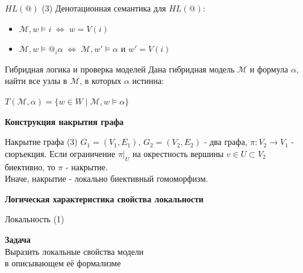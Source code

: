 \documentclass{beamer}
\begin{document}
\begin{frame}{$HL(@)$ (3)}
Денотационная семантика для $HL(@)$:\\
\bigskip
\begin{itemize}
	\item $\mathcal{M}, w \models i \; \Leftrightarrow \; w = V(i)$
	\item $\mathcal{M}, w \models @_i \alpha \; \Leftrightarrow \; \mathcal{M}, w' \models \alpha$ и $w' = V(i)$
\end{itemize}
\end{frame}


\begin{frame}{Гибридная логика и проверка моделей}
Дана гибридная модель $\mathcal{M}$ и формула $\alpha$, найти все узлы в $\mathcal{M}$, в которых $\alpha$ истинна:
\bigskip
\begin{center}
    $T(\mathcal{M}, \alpha) = \{ w \in W \; | \; \mathcal{M}, w \models \alpha \}$
\end{center}
\end{frame}


\begin{frame}{}
\begin{center}
	\textbf{Конструкция накрытия графа}
\end{center}
\end{frame}

\begin{frame}{Накрытие графа (3)}
$G_1 = (V_1, E_1)$, $G_2 = (V_2, E_2)$ - два графа, $\pi: V_2 \to V_1$ - сюръекция. Если ограничение $\pi \vert_U$ на окрестность вершины $v \in U \subset V_2$ биективно, то $\pi$ - накрытие.\\
\bigskip
Иначе, накрытие - локально биективный гомоморфизм.
\end{frame}


\begin{frame}{}
\begin{center}
	\textbf{Логическая характеристика свойства локальности}
\end{center}
\end{frame}

\begin{frame}{Локальность (1)}
\begin{center}
\textbf{Задача}\\
\bigskip
Выразить локальные свойства модели \\в описывающем её формализме
\end{center}
\end{frame}
\end{document}

